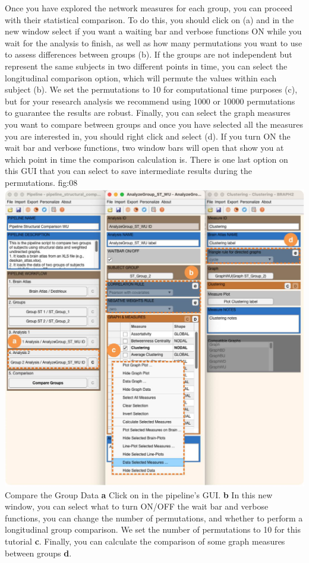 \documentclass[justified]{tufte-handout}
\begin{document}
Once you have explored the network measures for each group, you can proceed with their statistical comparison. To do this, you should click on  (a) and in the new window select if you want a waiting bar and verbose functions ON while you wait for the analysis to finish, as well as how many permutations you want to use to assess differences between groups ({b}). If the groups are not independent but represent the same subjects in two different points in time, you can select the longitudinal comparison option, which will permute the values within each subject ({b}). We set the permutations to 10 for computational time purposes ({c}), but for your research analysis we recommend using 1000 or 10000 permutations to guarantee the results are robust. Finally, you can select the graph measures you want to compare between groups and once you have selected all the measures you are interested in, you should right click and select  ({d}). If you turn ON the wait bar and verbose functions, two window bars will open that show you at which point in time the comparison calculation is. There is one last option on this GUI that you can select to save intermediate results during the permutations.
	{fig:08}
	{
	\includegraphics{fig08.jpg}
	}
	{Compare the Group Data}
	{
	{\bf a} Click on  in the pipeline's GUI.
	{\bf b} In this new window, you can select what to turn ON/OFF the wait bar and verbose functions, you can change the number of permutations, and whether to perform a longitudinal group comparison. We set the number of permutations to 10 for this tutorial {\bf c}. Finally, you can calculate the comparison of some graph measures between groups {\bf d}.
	}
 
\end{document}
